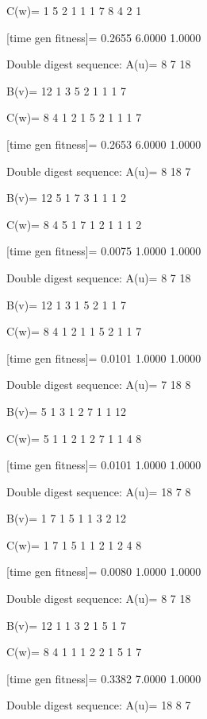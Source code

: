C(w)=
     1     5     2     1     1     1     7     8     4     2     1

[time gen fitness]=
    0.2655    6.0000    1.0000

Double digest sequence:
A(u)=
     8     7    18

B(v)=
    12     1     3     5     2     1     1     1     7

C(w)=
     8     4     1     2     1     5     2     1     1     1     7

[time gen fitness]=
    0.2653    6.0000    1.0000

Double digest sequence:
A(u)=
     8    18     7

B(v)=
    12     5     1     7     3     1     1     1     2

C(w)=
     8     4     5     1     7     1     2     1     1     1     2

[time gen fitness]=
    0.0075    1.0000    1.0000

Double digest sequence:
A(u)=
     8     7    18

B(v)=
    12     1     3     1     5     2     1     1     7

C(w)=
     8     4     1     2     1     1     5     2     1     1     7

[time gen fitness]=
    0.0101    1.0000    1.0000

Double digest sequence:
A(u)=
     7    18     8

B(v)=
     5     1     3     1     2     7     1     1    12

C(w)=
     5     1     1     2     1     2     7     1     1     4     8

[time gen fitness]=
    0.0101    1.0000    1.0000

Double digest sequence:
A(u)=
    18     7     8

B(v)=
     1     7     1     5     1     1     3     2    12

C(w)=
     1     7     1     5     1     1     2     1     2     4     8

[time gen fitness]=
    0.0080    1.0000    1.0000

Double digest sequence:
A(u)=
     8     7    18

B(v)=
    12     1     1     3     2     1     5     1     7

C(w)=
     8     4     1     1     1     2     2     1     5     1     7

[time gen fitness]=
    0.3382    7.0000    1.0000

Double digest sequence:
A(u)=
    18     8     7

